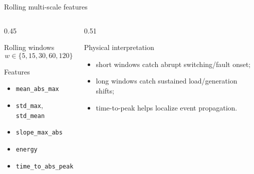 \documentclass[10pt,aspectratio=169]{beamer}
\newcommand{\code}[1]{\texttt{\footnotesize #1}}
\begin{document}
\begin{frame}{Rolling multi-scale features}
\small
\begin{columns}[T,totalwidth=\textwidth]
\begin{column}{0.45\textwidth}
\begin{block}{Rolling windows}
\[
w \in \{5,15,30,60,120\}
\]
\end{block}
\begin{block}{Features}
\begin{itemize}
  \item \code{mean\_abs\_max}
  \item \code{std\_max}, \code{std\_mean}
  \item \code{slope\_max\_abs}
  \item \code{energy}
  \item \code{time\_to\_abs\_peak}
\end{itemize}
\end{block}
\end{column}
\begin{column}{0.51\textwidth}
\begin{exampleblock}{Physical interpretation}
\begin{itemize}
  \item short windows catch abrupt switching/fault onset;
  \item long windows catch sustained load/generation shifts;
  \item time-to-peak helps localize event propagation.
\end{itemize}
\end{exampleblock}
\end{column}
\end{columns}
\end{frame}
\end{document}
